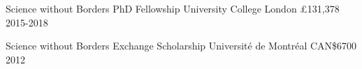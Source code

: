 

\begin{cvhonors}

  \cvhonor
    {Science without Borders PhD Fellowship} %
    {University College London} %
    {£131,378}%
    {2015-2018} %




  \cvhonor
    {Science without Borders Exchange Scholarship} %
    {Universit\'e de Montr\'eal} %
    {CAN\$6700} %
    {2012} %

\end{cvhonors}
